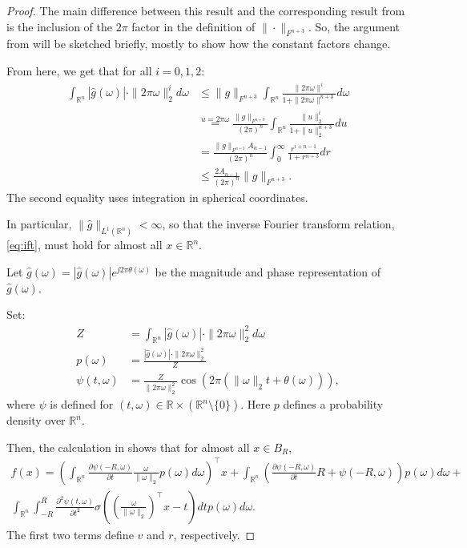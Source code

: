 \documentclass[twoside]{article}
\theoremstyle{definition}
\newcommand{\R}{\mathbb{R}}
\newcommand{\1}[1]{\scalebox{1.25}{$\mathds{1}$}\left[#1\right]}
\begin{document}
\begin{proof}
The main difference between this result and the corresponding result from \cite{lamperski2024approximation} is the inclusion of the $2\pi$ factor in the definition of $\|\cdot\|_{F^{n+3}}$. So, the argument from \cite{lamperski2024approximation} will be sketched briefly, mostly to show how the constant factors change. 

From here, we get that for all $i=0,1,2$:
\begin{align}
\nonumber
\int_{\R^n}|\hat g(\omega)|\cdot \|2\pi\omega\|_2^i d\omega &\le
\|g\|_{F^{n+3}}\int_{\R^n}\frac{\|2\pi\omega\|^i}{1+\|2\pi \omega\|^{n+3}}d\omega \\
\nonumber
&\overset{u=2\pi \omega}{=}\frac{\|g\|_{F^{n+3}}}{(2\pi)^n}\int_{\R^n}\frac{\|u\|_2^i}{1+\|u\|_2^{n+3}}du\\
\nonumber
&=\frac{\|g\|_{F^{n+3}}A_{n-1}}{(2\pi)^n}\int_0^{\infty}\frac{r^{i+n-1}}{1+r^{n+3}}dr\\
\label{eq:L1Bounds}
&\le \frac{2 A_{n-1}}{(2\pi)^n}\|g\|_{F^{n+3}}. 
\end{align}
The second equality uses integration in spherical coordinates. 

In particular, $\|\hat g\|_{L^1(\R^n)}<\infty$, so that the inverse Fourier transform relation, \eqref{eq:ift}, must hold for almost all $x\in\R^n$.

Let $\hat g(\omega)=|\hat g(\omega)|e^{j2\pi\theta(\omega)}$ be the magnitude and phase representation of $\hat g(\omega)$.

Set:
\begin{align*}
Z&=\int_{\R^n}|\hat g(\omega)|\cdot \|2\pi \omega\|_2^2 d\omega \\
p(\omega)&=\frac{|\hat g(\omega)|\cdot \|2\pi \omega\|_2^2}{Z} \\
\psi(t,\omega)&=\frac{Z}{\|2\pi\omega\|_2^2}\cos\left(2\pi(\|\omega\|_2 t+\theta(\omega))\right),
\end{align*}
where $\psi$ is defined for $(t,\omega)\in\R\times (\R^n\setminus\{0\})$. Here $p$ defines a probability density over $\R^n$.

Then, the calculation in \cite{lamperski2024approximation} shows that
for almost all $x\in B_R$, 
\begin{multline}
f(x)=\left(\int_{\R^n}\frac{\partial\psi(-R,\omega)}{\partial t}\frac{\omega}{\|\omega\|_2}p(\omega) d\omega \right)^\top x +
\int_{\R^n}\left(\frac{\partial \psi(-R,\omega)}{\partial t}R+\psi(-R,\omega) \right)p(\omega)d\omega +
\\
\int_{\R^n}\int_{-R}^R\frac{\partial^2\psi(t,\omega)}{\partial t^2}\sigma\left(
\left(\frac{\omega}{\|\omega\|_2}\right)^\top x-t
\right)dt p(\omega) d\omega.
\end{multline}
The first two terms define $v$ and $r$, respectively.


\end{proof}
\end{document}

